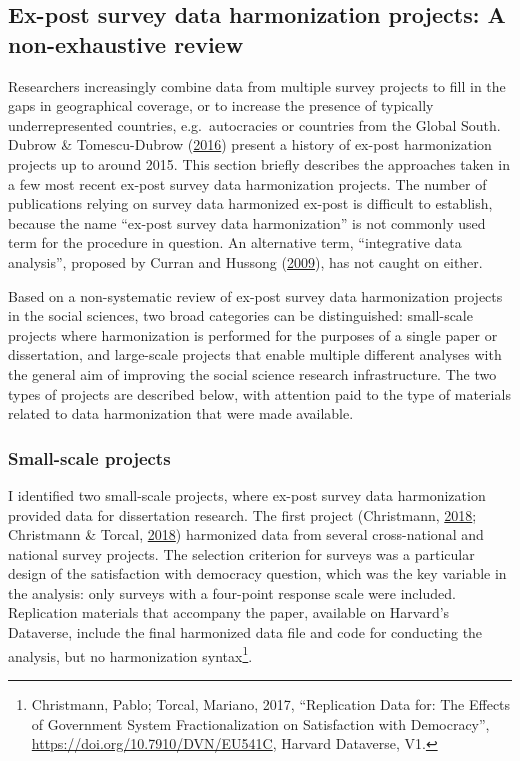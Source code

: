 \documentclass[12pt,]{article}
\let\rmarkdownfootnote\footnote%
\def\footnote{\protect\rmarkdownfootnote}
\begin{document}
\hypertarget{ex-post-survey-data-harmonization-projects-a-non-exhaustive-review}{%
\subsection{Ex-post survey data harmonization projects: A non-exhaustive review}\label{ex-post-survey-data-harmonization-projects-a-non-exhaustive-review}}

Researchers increasingly combine data from multiple survey projects to fill in the gaps in geographical coverage, or to increase the presence of typically underrepresented countries, e.g.~autocracies or countries from the Global South. Dubrow \& Tomescu-Dubrow (\protect\hyperlink{ref-Dubrow2016}{2016}) present a history of ex-post harmonization projects up to around 2015. This section briefly describes the approaches taken in a few most recent ex-post survey data harmonization projects. The number of publications relying on survey data harmonized ex-post is difficult to establish, because the name ``ex-post survey data harmonization'' is not commonly used term for the procedure in question. An alternative term, ``integrative data analysis'', proposed by Curran and Hussong (\protect\hyperlink{ref-Curran2009}{2009}), has not caught on either.

Based on a non-systematic review of ex-post survey data harmonization projects in the social sciences, two broad categories can be distinguished: small-scale projects where harmonization is performed for the purposes of a single paper or dissertation, and large-scale projects that enable multiple different analyses with the general aim of improving the social science research infrastructure. The two types of projects are described below, with attention paid to the type of materials related to data harmonization that were made available.

\hypertarget{small-scale-projects}{%
\subsubsection{Small-scale projects}\label{small-scale-projects}}

I identified two small-scale projects, where ex-post survey data harmonization provided data for dissertation research. The first project (Christmann, \protect\hyperlink{ref-Christmann2018}{2018}; Christmann \& Torcal, \protect\hyperlink{ref-Christmann2018a}{2018}) harmonized data from several cross-national and national survey projects. The selection criterion for surveys was a particular design of the satisfaction with democracy question, which was the key variable in the analysis: only surveys with a four-point response scale were included. Replication materials that accompany the paper, available on Harvard's Dataverse, include the final harmonized data file and code for conducting the analysis, but no harmonization syntax\footnote{Christmann, Pablo; Torcal, Mariano, 2017, ``Replication Data for: The Effects of Government System Fractionalization on Satisfaction with Democracy'', \url{https://doi.org/10.7910/DVN/EU541C}, Harvard Dataverse, V1.}.
\end{document}
